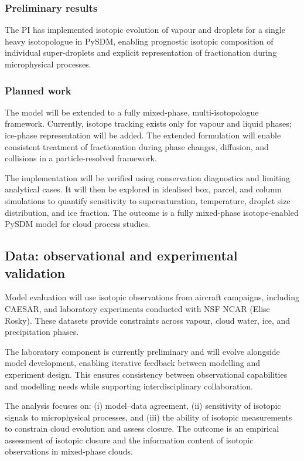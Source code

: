 \documentclass[11pt]{article}
\begin{document}
\subsubsection*{Preliminary results}
The PI has implemented isotopic evolution of vapour and droplets for a single heavy isotopologue in PySDM, enabling prognostic isotopic composition of individual super-droplets and explicit representation of fractionation during microphysical processes.

\subsubsection*{Planned work}
The model will be extended to a fully mixed-phase, multi-isotopologue framework. Currently, isotope tracking exists only for vapour and liquid phases; ice-phase representation will be added. The extended formulation will enable consistent treatment of fractionation during phase changes, diffusion, and collisions in a particle-resolved framework.

The implementation will be verified using conservation diagnostics and limiting analytical cases. It will then be explored in idealised box, parcel, and column simulations to quantify sensitivity to supersaturation, temperature, droplet size distribution, and ice fraction. The outcome is a fully mixed-phase isotope-enabled PySDM model for cloud process studies.

\subsection{Data: observational and experimental validation}\label{A3}
Model evaluation will use isotopic observations from aircraft campaigns, including CAESAR, and laboratory experiments conducted with NSF NCAR (Elise Rosky). These datasets provide constraints across vapour, cloud water, ice, and precipitation phases.

The laboratory component is currently preliminary and will evolve alongside model development, enabling iterative feedback between modelling and experiment design. This ensures consistency between observational capabilities and modelling needs while supporting interdisciplinary collaboration.

The analysis focuses on: (i) model–data agreement, (ii) sensitivity of isotopic signals to microphysical processes, and (iii) the ability of isotopic measurements to constrain cloud evolution and assess closure. The outcome is an empirical assessment of isotopic closure and the information content of isotopic observations in mixed-phase clouds.
\end{document}
